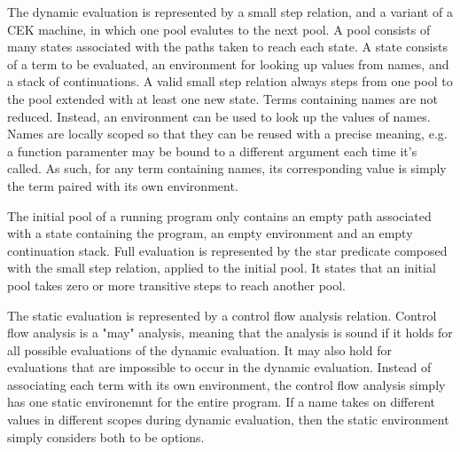 \documentclass[letterpaper, 11pt]{report}
\begin{document}
The dynamic evaluation is represented by a small step relation, and a variant of a CEK machine, in which one pool evalutes
to the next pool. A pool consists of many states associated with the paths taken to reach each state. A state consists
of a term to be evaluated, an environment for looking up values from names, and a stack of continuations.
A valid small step relation always steps from one pool to the pool extended with at least one new state.
Terms containing names are not reduced. Instead, an environment can be used to look up the values of names.
Names are locally scoped so that they can be reused with a precise meaning, e.g. a function paramenter may be bound to
a different argument each time it's called. As such, for any term containing names, its corresponding value is simply
the term paired with its own environment.

The initial pool of a running program only contains an empty path associated with a state containing the program,
an empty environment and an empty continuation stack.
Full evaluation is represented by the star predicate composed with the small step relation, applied to the initial pool.
It states that an initial pool takes zero or more transitive steps to reach another pool.

The static evaluation is represented by a control flow analysis relation. Control flow analysis is a "may" analysis,
meaning that the analysis is sound if it holds for all possible evaluations of the dynamic evaluation.
It may also hold for evaluations that are impossible to occur in the dynamic evaluation.
Instead of associating each term with its own environment, the control flow analysis simply has one static environemnt
for the entire program. If a name takes on different values in different scopes during dynamic evaluation, then
the static environment simply considers both to be options. 
\end{document}

